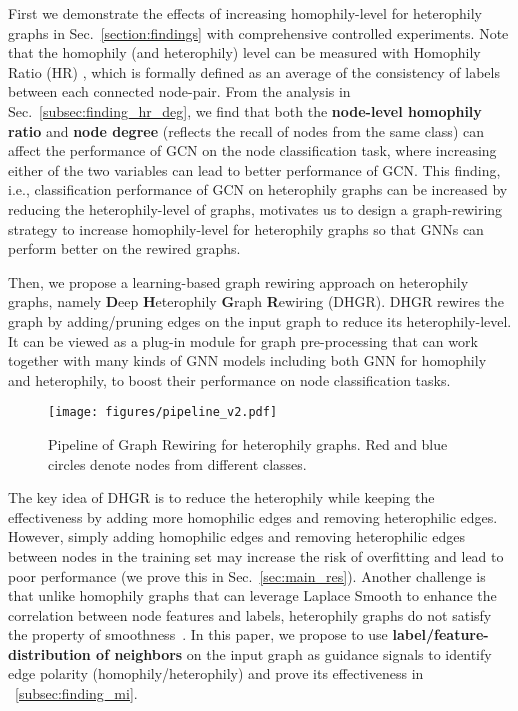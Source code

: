 \documentclass[sigconf]{acmart}
\begin{document}
	First we demonstrate the effects of increasing homophily-level  for heterophily graphs in Sec.~\ref{section:findings} with comprehensive controlled experiments. Note that the homophily (and heterophily) level can be measured with Homophily Ratio (HR) \cite{pei2020geom,h2gcn}, which is formally defined as an average of the consistency of labels between each connected node-pair. From the analysis in Sec.~\ref{subsec:finding_hr_deg}, we find that both the \textbf{node-level homophily ratio} \cite{du2022gbk,pei2020geom} and \textbf{node degree} (reflects the recall of nodes from the same class) can affect the performance of GCN on the node classification task, where increasing either of the two variables can lead to better performance of GCN. This finding, i.e., classification performance of GCN on heterophily graphs can be increased by reducing the heterophily-level of graphs, motivates us to design a graph-rewiring strategy to increase homophily-level for heterophily graphs so that GNNs can perform better on the rewired graphs.
	
	
Then, we propose a learning-based graph rewiring approach on heterophily graphs, namely \textbf{D}eep \textbf{H}eterophily \textbf{G}raph \textbf{R}ewiring (DHGR). DHGR rewires the graph by adding/pruning edges on the input graph to reduce its heterophily-level. It can be viewed as a plug-in module for graph pre-processing that can work together with many kinds of GNN models including both GNN for homophily and heterophily, to boost their performance on node classification tasks. 
	\begin{figure}[h]
		\centering
		\texttt{[image: figures/pipeline\_v2.pdf]}
		\caption{Pipeline of Graph Rewiring for heterophily graphs. Red and blue circles denote nodes from different classes. }
		\label{fig:piepline}
\end{figure}
	The key idea of DHGR is to reduce the heterophily while keeping the effectiveness by adding more homophilic edges and removing heterophilic edges. 
	However, simply adding homophilic edges and removing heterophilic edges between nodes in the training set may increase the risk of overfitting and lead to poor performance (we prove this in Sec.~\ref{sec:main_res}). 
	Another challenge is that unlike homophily graphs that can leverage Laplace Smooth to enhance the correlation between node features and labels, heterophily graphs do not satisfy the property of smoothness~\cite{smooth2, smooth1}.
	In this paper, we propose to use \textbf{label/feature-distribution of neighbors} on the input graph as guidance signals to identify edge polarity (homophily/heterophily)  and prove its effectiveness in ~\ref{subsec:finding_mi}.
	
\end{document}
